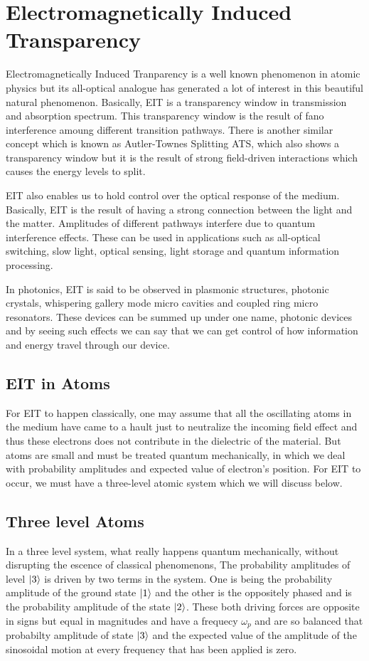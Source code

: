 \section{Electromagnetically Induced Transparency}
Electromagnetically Induced Tranparency is a well known phenomenon in atomic physics but its all-optical analogue has generated a lot of interest in this beautiful natural phenomenon. Basically, EIT is a transparency window in transmission and absorption spectrum. This transparency window is the result of fano interference amoung different transition pathways. There is another similar concept which is known as Autler-Townes Splitting ATS, which also shows a transparency window but it is the result of strong field-driven interactions which causes the energy levels to split.

EIT also enables us to hold control over the optical response of the medium. Basically, EIT is the result of having a strong connection between the light and the matter. Amplitudes of different pathways interfere due to quantum interference effects. These can be used in applications such as all-optical switching, slow light, optical sensing, light storage and quantum information processing.

In photonics, EIT is said to be observed in plasmonic structures, photonic crystals, whispering gallery mode micro cavities and coupled ring micro resonators. These devices can be summed up under one name, photonic devices and by seeing such effects we can say that we can get control of how information and energy travel through our device.

\subsection{EIT in Atoms}
For EIT to happen classically, one may assume that all the oscillating atoms in the medium have came to a hault just to neutralize the incoming field effect and thus these electrons does not contribute in the dielectric of the material. But atoms are small and must be treated quantum mechanically, in which we deal with probability amplitudes and expected value of electron's position. For EIT to occur, we must have a three-level atomic system which we will discuss below.
\subsection{Three level Atoms}
In a three level system, what really happens quantum mechanically, without disrupting the escence of classical phenomenons, The probability amplitudes of level $\ket{3}$ is driven by two terms in the system. One is being the probability amplitude of the ground state $\ket{1}$ and the other is the oppositely phased and is the probability amplitude of the state $\ket{2}$. These both driving forces are opposite in signs but equal in magnitudes and have a frequecy $\omega_{p}$ and are so balanced that probabilty amplitude of state $\ket{3}$ and the expected value of the amplitude of the sinosoidal motion at every frequency that has been applied is zero. 

